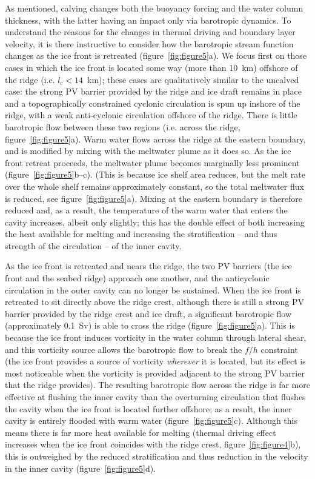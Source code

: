 \documentclass[draft]{agujournal2019}
\begin{document}
As mentioned, calving changes both the buoyancy forcing and the water column thickness, with the latter having an impact only via barotropic dynamics. To understand the reasons for the changes in thermal driving and boundary layer velocity, it is there instructive to consider how the barotropic stream function changes as the ice front is retreated (figure~\ref{fig:figure5}a). We focus first on those cases in which the ice front is located some way (more than 10~km) offshore of the ridge (i.e. $l_c<14$~km); these cases are qualitatively similar to the uncalved case: the strong PV barrier provided by the ridge and ice draft remains in place and a topographically constrained cyclonic circulation is spun up inshore of the ridge, with a weak anti-cyclonic circulation offshore of the ridge. There is little barotropic flow between these two regions (i.e. across the ridge, figure~\ref{fig:figure5}a). Warm water flows across the ridge at the eastern boundary, and is modified by mixing with the meltwater plume as it does so. As the ice front retreat proceeds, the meltwater plume becomes marginally less prominent (figure~\ref{fig:figure5}b--c). (This is because ice shelf area reduces, but the melt rate over the whole shelf remains approximately constant, so the total meltwater flux is reduced, see figure~\ref{fig:figure5}a). Mixing at the eastern boundary is therefore reduced and, as a result, the temperature of the warm water that enters the cavity increases, albeit only slightly; this has the double effect of both increasing the heat available for melting and increasing the stratification -- and thus strength of the circulation -- of the inner cavity.

As the ice front is retreated and nears the ridge, the two PV barriers (the ice front and the seabed ridge) approach one another, and the anticyclonic circulation in the outer cavity can no longer be sustained.  When the ice front is retreated to sit directly above the ridge crest, although there is still a strong PV barrier provided by the ridge crest and ice draft, a significant barotropic flow (approximately 0.1~Sv) is able to cross the ridge (figure~\ref{fig:figure5}a). This is because the ice front induces vorticity in the water column through lateral shear, and this vorticity source allows the barotropic flow to break the $f/h$ constraint (the ice front provides a source of vorticity \emph{wherever} it is located, but its effect is most noticeable when the vorticity is provided adjacent to the strong PV barrier that the ridge provides).  The resulting barotropic flow across the ridge is far more effective at flushing the inner cavity than the overturning circulation that flushes the cavity when the ice front is located further offshore; as a result, the inner cavity is entirely flooded with warm water (figure~\ref{fig:figure5}c). Although this means there is far more heat available for melting (thermal driving effect increases when the ice front coincides with the ridge crest, figure~\ref{fig:figure4}b), this is outweighed by the reduced stratification and thus reduction in the velocity in the inner cavity (figure~\ref{fig:figure5}d).
\end{document}
